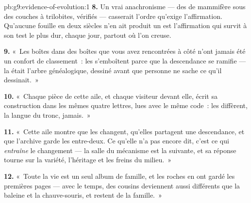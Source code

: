 \begin{solution}{pb:g9:evidence-of-evolution:1}
\textbf{8.} Un vrai anachronisme --- des  de mammifère
sous des couches à trilobites, vérifiés --- casserait
l'ordre qu'exige l'affirmation. Qu'aucune fouille en deux
siècles n'en ait produit un est l'affirmation qui survit à
son test le plus dur, chaque jour, partout où l'on creuse.

\textbf{9.} «~Les boîtes dans des boîtes que vous avez
rencontrées à côté n'ont jamais été un confort de
classement~: les  s'emboîtent parce que la
descendance se ramifie --- la  était l'arbre
généalogique, dessiné avant que personne ne sache ce qu'il
dessinait.~»

\textbf{10.} «~Chaque pièce de cette aile, et chaque
visiteur devant elle, écrit sa construction dans les mêmes
quatre lettres, lues avec le même code~: les 
diffèrent, la langue du tronc, jamais.~»

\textbf{11.} «~Cette aile montre que les  changent,
qu'elles partagent une descendance, et que l'archive garde
les entre-deux. Ce qu'elle n'a pas encore dit, c'est ce qui
\emph{entraîne} le changement --- la salle du mécanisme est
la suivante, et sa réponse tourne sur la variété, l'héritage
et les freins du milieu.~»

\textbf{12.} «~Toute la vie est un seul album de famille, et
les roches en ont gardé les premières pages --- avec le
temps, des cousins deviennent aussi différents que la
baleine et la chauve-souris, et restent de la famille.~»
\end{solution}
